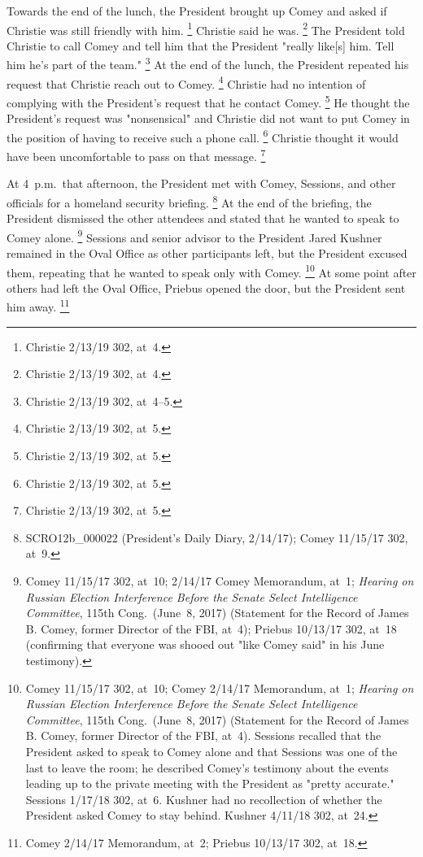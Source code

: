Towards the end of the lunch, the President brought up Comey and asked if Christie was still friendly with him.%
\footnote{Christie 2/13/19 302, at~4.}
Christie said he was.%
\footnote{Christie 2/13/19 302, at~4.}
The President told Christie to call Comey and tell him that the President "really like[s] him.
Tell him he's part of the team."%
\footnote{Christie 2/13/19 302, at~4--5.}
At the end of the lunch, the President repeated his request that Christie reach out to Comey.%
\footnote{Christie 2/13/19 302, at~5.}
Christie had no intention of complying with the President's request that he contact Comey.%
\footnote{Christie 2/13/19 302, at~5.}
He thought the President's request was "nonsensical" and Christie did not want to put Comey in the position of having to receive such a phone call.%
\footnote{Christie 2/13/19 302, at~5.}
Christie thought it would have been uncomfortable to pass on that message.%
\footnote{Christie 2/13/19 302, at~5.}

At 4~p.m.\ that afternoon, the President met with Comey, Sessions, and other officials for a homeland security briefing.%
\footnote{SCRO12b\_000022 (President's Daily Diary, 2/14/17);
Comey 11/15/17 302, at~9.}
At the end of the briefing, the President dismissed the other attendees and stated that he wanted to speak to Comey alone.%
\footnote{Comey 11/15/17 302, at~10;
2/14/17 Comey Memorandum, at~1;
\textit{Hearing on Russian Election Interference Before the Senate Select Intelligence Committee}, 115th Cong.\ (June~8, 2017) (Statement for the Record of James B. Comey, former Director of the FBI, at~4);
Priebus 10/13/17 302, at~18 (confirming that everyone was shooed out "like Comey said" in his June testimony).}
Sessions and senior advisor to the President Jared Kushner remained in the Oval Office as other participants left, but the President excused them, repeating that he wanted to speak only with Comey.%
\footnote{Comey 11/15/17 302, at~10;
Comey 2/14/17 Memorandum, at~1;
\textit{Hearing on Russian Election Interference Before the Senate Select Intelligence Committee}, 115th Cong.\ (June~8, 2017) (Statement for the Record of James B. Comey, former Director of the FBI, at~4).
Sessions recalled that the President asked to speak to Comey alone and that Sessions was one of the last to leave the room;
he described Comey's testimony about the events leading up to the private meeting with the President as "pretty accurate."
Sessions 1/17/18 302, at~6.
Kushner had no recollection of whether the President asked Comey to stay behind.
Kushner 4/11/18 302, at~24.}
At some point after others had left the Oval Office, Priebus opened the door, but the President sent him away.%
\footnote{Comey 2/14/17 Memorandum, at~2;
Priebus 10/13/17 302, at~18.}

